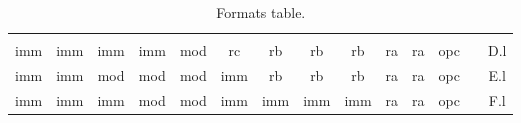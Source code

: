 \begin{table}[hbt!]
\begin{tabular}{cccccccccccccc}
 &
   &
   &
   &
   &
   &
   &
   &
   &
   &
   &
   &
   &
   \\ \cline{1-12} \cline{14-14} 
\multicolumn{1}{|c|}{imm} &
  \multicolumn{1}{c|}{imm} &
  \multicolumn{1}{c|}{imm} &
  \multicolumn{1}{c|}{imm} &
  \multicolumn{1}{c|}{mod} &
  \multicolumn{1}{c|}{rc} &
  \multicolumn{1}{c|}{rb} &
  \multicolumn{1}{c|}{rb} &
  \multicolumn{1}{c|}{rb} &
  \multicolumn{1}{c|}{ra} &
  \multicolumn{1}{c|}{ra} &
  \multicolumn{1}{c|}{opc} &
  \multicolumn{1}{c|}{} &
  \multicolumn{1}{c|}{D.l} \\ \cline{1-12} \cline{14-14} 
\multicolumn{1}{|c|}{imm} &
  \multicolumn{1}{c|}{imm} &
  \multicolumn{1}{c|}{mod} &
  \multicolumn{1}{c|}{mod} &
  \multicolumn{1}{c|}{mod} &
  \multicolumn{1}{c|}{imm} &
  \multicolumn{1}{c|}{rb} &
  \multicolumn{1}{c|}{rb} &
  \multicolumn{1}{c|}{rb} &
  \multicolumn{1}{c|}{ra} &
  \multicolumn{1}{c|}{ra} &
  \multicolumn{1}{c|}{opc} &
  \multicolumn{1}{c|}{} &
  \multicolumn{1}{c|}{E.l} \\ \cline{1-12} \cline{14-14} 
\multicolumn{1}{|c|}{imm} &
  \multicolumn{1}{c|}{imm} &
  \multicolumn{1}{c|}{imm} &
  \multicolumn{1}{c|}{mod} &
  \multicolumn{1}{c|}{mod} &
  \multicolumn{1}{c|}{imm} &
  \multicolumn{1}{c|}{imm} &
  \multicolumn{1}{c|}{imm} &
  \multicolumn{1}{c|}{imm} &
  \multicolumn{1}{c|}{ra} &
  \multicolumn{1}{c|}{ra} &
  \multicolumn{1}{c|}{opc} &
  \multicolumn{1}{c|}{} &
  \multicolumn{1}{c|}{F.l} \\ \cline{1-12} \cline{14-14} 
\end{tabular}
\caption[Formats trable]{Formats table.}
\end{table}